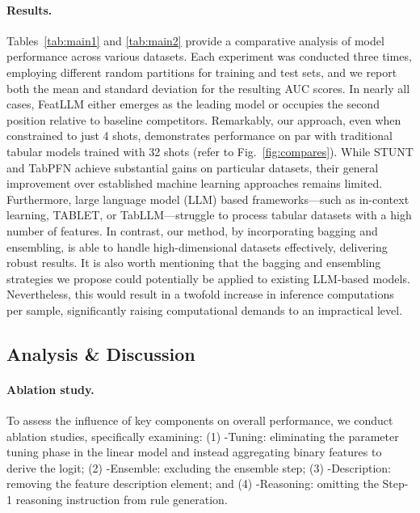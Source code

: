 \vspace*{-0.12in}
\paragraph{Results.}
Tables~\ref{tab:main1} and \ref{tab:main2} provide a comparative analysis of model performance across various datasets. Each experiment was conducted three times, employing different random partitions for training and test sets, and we report both the mean and standard deviation for the resulting AUC scores. In nearly all cases, \textsf{FeatLLM} either emerges as the leading model or occupies the second position relative to baseline competitors. Remarkably, our approach, even when constrained to just 4 shots, demonstrates performance on par with traditional tabular models trained with 32 shots (refer to Fig.~\ref{fig:compares}). While STUNT and TabPFN achieve substantial gains on particular datasets, their general improvement over established machine learning approaches remains limited. Furthermore, large language model (LLM) based frameworks—such as in-context learning, TABLET, or TabLLM—struggle to process tabular datasets with a high number of features. In contrast, our method, by incorporating bagging and ensembling, is able to handle high-dimensional datasets effectively, delivering robust results. It is also worth mentioning that the bagging and ensembling strategies we propose could potentially be applied to existing LLM-based models. Nevertheless, this would result in a twofold increase in inference computations per sample, significantly raising computational demands to an impractical level.

\subsection{Analysis \& Discussion}
\label{sec:analysis}
\paragraph{Ablation study.} To assess the influence of key components on overall performance, we conduct ablation studies, specifically examining: (1) \textsf{-Tuning}: eliminating the parameter tuning phase in the linear model and instead aggregating binary features to derive the logit; (2) \textsf{-Ensemble}: excluding the ensemble step; (3) \textsf{-Description}: removing the feature description element; and (4) \textsf{-Reasoning}: omitting the Step-1 reasoning instruction from rule generation.

